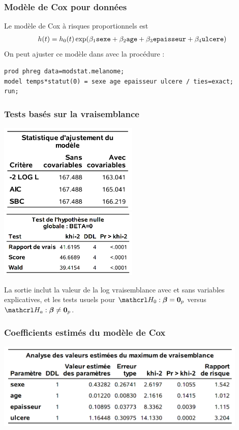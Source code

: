 \documentclass{beamer}
\begin{document}
\begin{frame}[fragile]
\frametitle{Modèle de Cox pour données }
 Le modèle de Cox à risques proportionnels est 
\begin{align*}
h(t) = h_0(t) \exp( \beta_1 \texttt{sexe} + \beta_2 \texttt{age} + \beta_3 \texttt{epaisseur} + \beta_4 \texttt{ulcere})
\end{align*}
 On peut ajuster ce modèle dans \SASlang{} avec la procédure :
\vp \vp
\begin{tcolorbox}[colback=white,colframe=hecblue,title=Code \SASlang{} pour le modèle à risque proportionnel]
{\footnotesize 
\begin{verbatim}
prod phreg data=modstat.melanome;
model temps*statut(0) = sexe age epaisseur ulcere / ties=exact;
run;
\end{verbatim}
}
\end{tcolorbox}
\end{frame}

\begin{frame}
\frametitle{Tests basés sur la vraisemblance}
\vp \vp
\begin{center}
\includegraphics[width = 0.5\textwidth]{img/c7/diapos7e12}
\includegraphics[width = 0.5\textwidth]{img/c7/diapos7e13}
\end{center}
{\footnotesize
La sortie inclut la valeur de la log vraisemblance avec et sans variables explicatives, et les tests usuels pour $\Hy_0: \bs{\beta}=\bs{0}_p$ versus $\Hy_a: \bs{\beta} \neq \bs{0}_p$.

}
\end{frame}

\begin{frame}
\frametitle{Coefficients estimés du modèle de Cox}
\vp \vp
\begin{center}
\includegraphics[width = 0.9\textwidth]{img/c7/diapos7e14}
\end{center}
% 

\end{frame}
\end{document}
